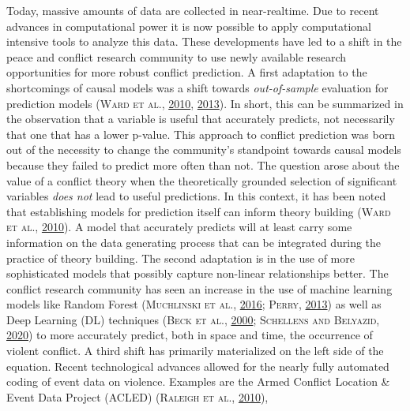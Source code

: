\documentclass[a4paper,11pt]{article}
\begin{document}
Today, massive amounts of data are collected in near-realtime. Due to recent
advances in computational power it is now possible to apply computational intensive
tools to analyze this data. These developments have led to a shift in the
peace and conflict research community to use newly available research opportunities
for more robust conflict prediction. A first adaptation to the shortcomings of causal models
was a shift towards \emph{out-of-sample} evaluation for prediction models \textsc{(\textnormal{\textsc{Ward} \textsc{et al.}}, \textnormal{\protect\hyperlink{ref-ward2010}{2010}}, \protect\hyperlink{ref-ward2013}{2013})}.
In short, this can be summarized in the observation that a variable is
useful that accurately predicts, not necessarily that one that has a lower
p-value. This approach to conflict prediction was born out of the necessity to
change the community's standpoint towards causal models because they failed to predict more
often than not. The question arose about the value of a conflict theory when the
theoretically grounded selection of significant variables \emph{does not} lead to useful
predictions. In this context, it has been noted that establishing models for
prediction itself can inform theory building \textsc{(\textnormal{\textsc{Ward} \textsc{et al.}}, \textnormal{\protect\hyperlink{ref-ward2010}{2010}})}. A model that accurately predicts
will at least carry some information on the data generating process that can be
integrated during the practice of theory building. The second adaptation is in
the use of more sophisticated models that possibly capture non-linear
relationships better. The conflict research community has seen an increase in the use of
machine learning models like Random Forest \textsc{(\textnormal{\textsc{Muchlinski} \textsc{et al.}}, \textnormal{\protect\hyperlink{ref-muchlinski2016}{2016}}; \textnormal{\textsc{Perry}}, \textnormal{\protect\hyperlink{ref-perry2013}{2013}})} as well as
Deep Learning (DL) techniques \textsc{(\textnormal{\textsc{Beck} \textsc{et al.}}, \textnormal{\protect\hyperlink{ref-beck2000}{2000}}; \textnormal{\textsc{Schellens} and \textsc{Belyazid}}, \textnormal{\protect\hyperlink{ref-schellens2020}{2020}})} to more accurately predict,
both in space and time, the occurrence of violent conflict. A third shift has
primarily materialized on the left side of the equation. Recent technological
advances allowed for the nearly fully automated coding of event data on violence.
Examples are the Armed Conflict Location \& Event Data Project (ACLED) \textsc{(\textnormal{\textsc{Raleigh} \textsc{et al.}}, \textnormal{\protect\hyperlink{ref-raleigh2010a}{2010}})},
\end{document}
